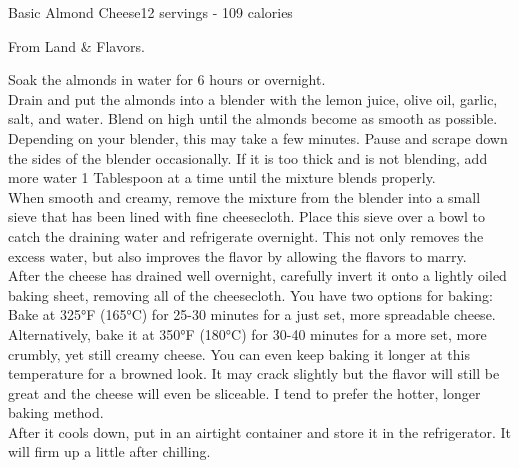 \begin{recipe}{Basic Almond Cheese}{12 servings - 109 calories}{}

\freeform From Land \& Flavors.


Soak the almonds in water for 6 hours or overnight.\\

Drain and put the almonds into a blender with the lemon juice, olive oil, garlic, salt, and water.
Blend on high until the almonds become as smooth as possible. Depending on your blender, this may take a few minutes. Pause and scrape down the sides of the blender occasionally. If it is too thick and is not blending, add more water 1 Tablespoon at a time until the mixture blends properly.\\

When smooth and creamy, remove the mixture from the blender into a small sieve that has been lined with fine cheesecloth. Place this sieve over a bowl to catch the draining water and refrigerate overnight. This not only removes the excess water, but also improves the flavor by allowing the flavors to marry.\\

After the cheese has drained well overnight, carefully invert it onto a lightly oiled baking sheet, removing all of the cheesecloth. You have two options for baking: Bake at 325°F (165°C) for 25-30 minutes for a just set, more spreadable cheese. Alternatively, bake it at 350°F (180°C) for 30-40 minutes for a more set, more crumbly, yet still creamy cheese. You can even keep baking it longer at this temperature for a browned look. It may crack slightly but the flavor will still be great and the cheese will even be sliceable. I tend to prefer the hotter, longer baking method.\\

After it cools down, put in an airtight container and store it in the refrigerator. It will firm up a little after chilling.

\end{recipe}